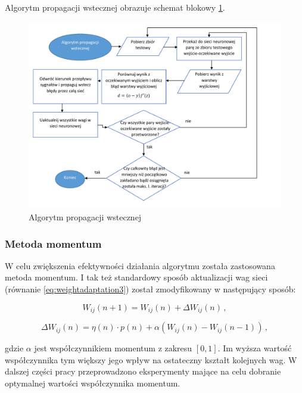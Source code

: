 \documentclass[twoside]{iisthesis}
\begin{document}
		 Algorytm propagacji wstecznej obrazuje schemat blokowy \ref{fig:propagacjawsteczna}.
		 
			\begin{figure}[!ht] 
				\centering
				\includegraphics[width=1\textwidth]{propagacjawsteczna}
				\caption{Algorytm propagacji wstecznej}
				\label{fig:propagacjawsteczna}
			\end{figure}
			
		 \subsubsection{Metoda momentum}
	 
		 W celu zwiększenia efektywności działania algorytmu została zastosowana metoda momentum. I tak też standardowy sposób aktualizacji wag sieci (równanie \ref{eq:weightadaptation3}) został zmodyfikowany w następujący sposób:
		 
		 \begin{equation}
		 \label{eq:zasadamomentum1}
		 W_{ij}(n+1) = W_{ij}(n) + \Delta W_{ij}(n) 
		 \,,
		 \end{equation}
		 
		 \begin{equation}
		 \label{eq:zasadamomentum2}
		 \Delta W_{ij}(n) = \eta(n) \cdot p(n) + \alpha(W_{ij}(n)-W_{ij}(n-1)) 
		 \,,
		 \end{equation}
		 
		 gdzie $\alpha$ jest współczynnikiem momentum z zakresu $[0,1]$. Im wyższa wartość współczynnika tym większy jego wpływ na ostateczny kształt kolejnych wag. W dalszej części pracy przeprowadzono eksperymenty mające na celu dobranie optymalnej wartości współczynnika momentum.
		 
\end{document}
